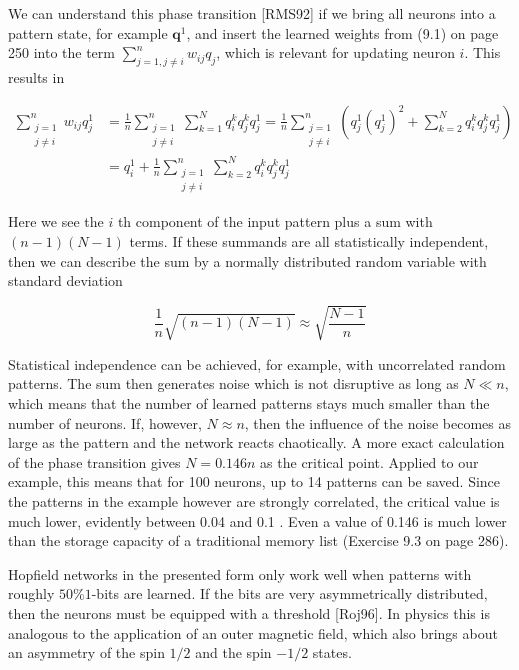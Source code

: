 \documentclass[10pt]{article}
\begin{document}
We can understand this phase transition [RMS92] if we bring all neurons into a pattern state, for example $\boldsymbol{q}^{1}$, and insert the learned weights from (9.1) on page 250 into the term $\sum_{j=1, j \neq i}^{n} w_{i j} q_{j}$, which is relevant for updating neuron $i$. This results in

$$
\begin{aligned}
\sum_{\substack{j=1 \\
j \neq i}}^{n} w_{i j} q_{j}^{1} & =\frac{1}{n} \sum_{\substack{j=1 \\
j \neq i}}^{n} \sum_{k=1}^{N} q_{i}^{k} q_{j}^{k} q_{j}^{1}=\frac{1}{n} \sum_{\substack{j=1 \\
j \neq i}}^{n}\left(q_{j}^{1}\left(q_{j}^{1}\right)^{2}+\sum_{k=2}^{N} q_{i}^{k} q_{j}^{k} q_{j}^{1}\right) \\
& =q_{i}^{1}+\frac{1}{n} \sum_{\substack{j=1 \\
j \neq i}}^{n} \sum_{k=2}^{N} q_{i}^{k} q_{j}^{k} q_{j}^{1}
\end{aligned}
$$

Here we see the $i$ th component of the input pattern plus a sum with $(n-1)(N-1)$ terms. If these summands are all statistically independent, then we can describe the sum by a normally distributed random variable with standard deviation

$$
\frac{1}{n} \sqrt{(n-1)(N-1)} \approx \sqrt{\frac{N-1}{n}}
$$

Statistical independence can be achieved, for example, with uncorrelated random patterns. The sum then generates noise which is not disruptive as long as $N \ll n$, which means that the number of learned patterns stays much smaller than the number of neurons. If, however, $N \approx n$, then the influence of the noise becomes as large as the pattern and the network reacts chaotically. A more exact calculation of the phase transition gives $N=0.146 n$ as the critical point. Applied to our example, this means that for 100 neurons, up to 14 patterns can be saved. Since the patterns in the example however are strongly correlated, the critical value is much lower, evidently between 0.04 and 0.1 . Even a value of 0.146 is much lower than the storage capacity of a traditional memory list (Exercise 9.3 on page 286).

Hopfield networks in the presented form only work well when patterns with roughly $50 \% 1$-bits are learned. If the bits are very asymmetrically distributed, then the neurons must be equipped with a threshold [Roj96]. In physics this is analogous to the application of an outer magnetic field, which also brings about an asymmetry of the spin $1 / 2$ and the spin $-1 / 2$ states.
\end{document}
